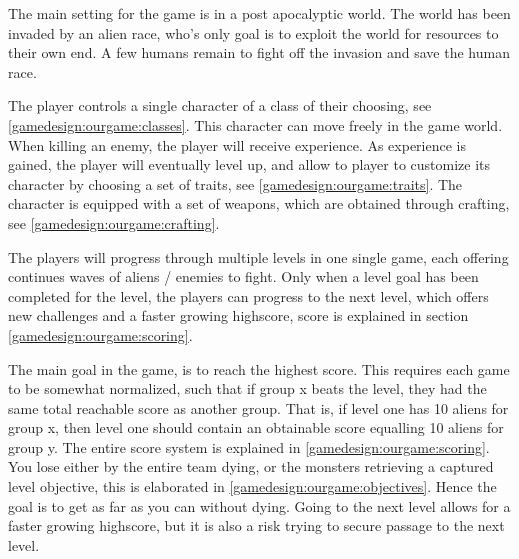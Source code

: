 
The main setting for the game is in a post apocalyptic world.
The world has been invaded by an alien race, who's only goal is to exploit the world for resources to their own end. 
A few humans remain to fight off the invasion and save the human race. 

The player controls a single character of a class of their choosing, see \ref{gamedesign:ourgame:classes}. 
This character can move freely in the game world.
When killing an enemy, the player will receive experience.
As experience is gained, the player will eventually level up, and allow to player to customize its character by choosing a set of traits, see \ref{gamedesign:ourgame:traits}.
The character is equipped with a set of weapons, which are obtained through crafting, see \ref{gamedesign:ourgame:crafting}.

The players will progress through multiple levels in one single game, each offering continues waves of aliens / enemies to fight. Only when a level goal has been completed for the level, the players can progress to the next level, which offers new challenges and a faster growing highscore, score is explained in section \ref{gamedesign:ourgame:scoring}. 

The main goal in the game, is to reach the highest score. This requires each game to be somewhat normalized, such that if group x beats the level, they had the same total reachable score as another group. That is, if level one has 10 aliens for group x, then level one should contain an obtainable score equalling 10 aliens for group y. The entire score system is explained in \ref{gamedesign:ourgame:scoring}. You lose either by the entire team dying, or the monsters retrieving a captured level objective, this is elaborated in \ref{gamedesign:ourgame:objectives}. Hence the goal is to get as far as you can without dying. Going to the next level allows for a faster growing highscore, but it is also a risk trying to secure passage to the next level.




